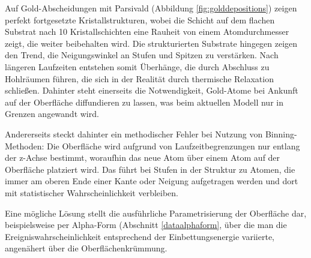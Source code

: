 Auf  Gold-Abscheidungen mit Parsivald (Abbildung \ref{fig:golddepositions}) zeigen perfekt fortgesetzte Kristallstrukturen, wobei die Schicht auf dem flachen Substrat nach 10 Kristallschichten eine Rauheit von einem Atomdurchmesser zeigt, die weiter beibehalten wird.
Die strukturierten Substrate hingegen zeigen den Trend, die Neigungswinkel an Stufen und Spitzen zu verstärken.
Nach längeren Laufzeiten entstehen somit Überhänge, die durch Abschluss zu Hohlräumen führen, die sich in der Realität durch thermische Relaxation schließen.
Dahinter steht einerseits die Notwendigkeit, Gold-Atome bei Ankunft auf der Oberfläche diffundieren zu lassen, was beim aktuellen Modell nur in Grenzen angewandt wird.

Andererseits steckt dahinter ein methodischer Fehler bei Nutzung von Binning-Methoden:
Die Oberfläche wird aufgrund von Laufzeitbegrenzungen nur entlang der z-Achse bestimmt, woraufhin das neue Atom über einem Atom auf der Oberfläche platziert wird.
Das führt bei Stufen in der Struktur zu Atomen, die immer am oberen Ende einer Kante oder Neigung aufgetragen werden und dort mit statistischer Wahrscheinlichkeit verbleiben.

Eine mögliche Lösung stellt die ausführliche Parametrisierung der Oberfläche dar, beispielsweise per Alpha-Form (Abschnitt \ref{dataalphaform}, über die man die Ereigniswahrscheinlichkeit entsprechend der Einbettungsenergie variierte, angenähert über die Oberflächenkrümmung.
